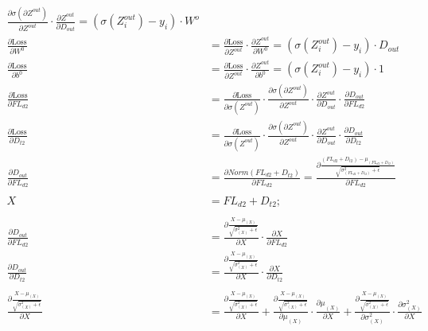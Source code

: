 \documentclass[12pt,letterpaper]{article}
\begin{document}
\begin{align*}
\frac{\partial \sigma(\partial Z^{out})}{\partial Z^{out}} \cdot 
\frac{\partial Z^{out}}{\partial D_{out}} = (\sigma(Z^{out}_i) - y_i) \cdot W^o
\\
\frac{\partial \text{Loss}}{\partial W^{0}} &= %
\frac{\partial \text{Loss}}{\partial Z^{out}} \cdot 
\frac{\partial Z^{out}}{\partial W^{0}}  = (\sigma(Z^{out}_i) - y_i) \cdot D_{out}
\\
\frac{\partial \text{Loss}}{\partial b^{0}} &= %
\frac{\partial \text{Loss}}{\partial Z^{out}} \cdot 
\frac{\partial Z^{out}}{\partial b^{0}}  = (\sigma(Z^{out}_i) - y_i) \cdot 1
\\
\frac{\partial \text{Loss}}{\partial FL_{d2}} &= %
\frac{\partial \text{Loss}}{\partial \sigma(Z^{out})} \cdot 
\frac{\partial \sigma(\partial Z^{out})}{\partial Z^{out}} \cdot 
\frac{\partial Z^{out}}{\partial D_{out}} \cdot
\frac{\partial D_{out}}{\partial FL_{d2}} 
\\
\frac{\partial \text{Loss}}{\partial D_{t2}} &= %
\frac{\partial \text{Loss}}{\partial \sigma(Z^{out})} \cdot 
\frac{\partial \sigma(\partial Z^{out})}{\partial Z^{out}} \cdot 
\frac{\partial Z^{out}}{\partial D_{out}} \cdot
\frac{\partial D_{out}}{\partial D_{t2}}
\\
\frac{\partial D_{out}}{\partial FL_{d2}}&=
\frac{\partial Norm(FL_{d2} + D_{t2})}{\partial FL_{d2}}=
\frac{\partial \frac{(FL_{d2} + D_{t2})-\mu_{(FL_{d2} + D_{t2})}}{\sqrt{\sigma^2_{(FL_{d2} + D_{t2})}+\epsilon}}}{\partial FL_{d2}}
\\\\
X&= FL_{d2} + D_{t2} ;\\ \\
\frac{\partial D_{out}}{\partial FL_{d2}}&=
\frac{\partial \frac{X-\mu_{(X)}}{\sqrt{\sigma^2_{(X)}+\epsilon}}}{\partial X}\cdot\frac{\partial X}{\partial FL_{d2}}
\\
\frac{\partial D_{out}}{\partial D_{t2}}&=
\frac{\partial \frac{X-\mu_{(X)}}{\sqrt{\sigma^2_{(X)}+\epsilon}}}{\partial X}\cdot\frac{\partial X}{\partial D_{t2}}
\\\\
\frac{\partial \frac{X-\mu_{(X)}}{\sqrt{\sigma^2_{(X)}+\epsilon}}}{\partial X} &=
\frac{\partial \frac{X-\mu_{(X)}}{\sqrt{\sigma^2_{(X)}+\epsilon}}}{\partial X}+
\frac{\partial \frac{X-\mu_{(X)}}{\sqrt{\sigma^2_{(X)}+\epsilon}}}{\partial \mu_{(X)}}\cdot \frac{\partial \mu_{(X)}}{\partial X}+
\frac{\partial \frac{X-\mu_{(X)}}{\sqrt{\sigma^2_{(X)}+\epsilon}}}{\partial \sigma^2_{(X)}}\cdot \frac{\partial \sigma^2_{(X)}}{\partial X}\\

\end{align*}
\end{document}
